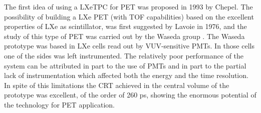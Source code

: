 \documentclass[review]{elsarticle}
\begin{document}
The first idea of using a LXeTPC for PET was proposed in 1993 by Chepel\cite{chepelFirst}. 
%
The possibility of building a LXe PET (with TOF capabilities) based on the excellent properties of LXe as scintillator, was first suggested by Lavoie in 1976\cite{lavoie}, and the study of this type of PET was carried out by the Waseda group \cite{Doke1,Nishikido2,Nishikido1}. The Waseda prototype was based in LXe cells read out by VUV-sensitive PMTs. In those cells one of the sides was left instrumented. The relatively poor performance of the system can be attributed in part to the use of PMTs and in part to the partial lack of instrumentation which affected both the energy and the time resolution. In spite of this limitations 
the CRT achieved in the central volume of the prototype was excellent, of the order of 260 ps, showing the enormous potential of the technology for PET application. 
\end{document}
